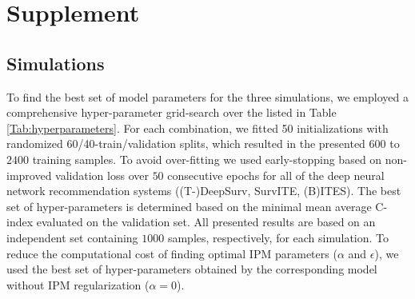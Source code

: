 \documentclass{article}
\newcommand{\beginsupplement}{%
	\setcounter{subsection}{0}
	\renewcommand{\thesubsection}{S\arabic{subsection}}
	\setcounter{table}{0}
	\renewcommand{\thetable}{S\arabic{table}}%
	\setcounter{figure}{0}
	\renewcommand{\thefigure}{S\arabic{figure}}%
	\newcounter{SIfig}
	\renewcommand{\theSIfig}{S\arabic{SIfig}}
}
\begin{document}
	
	
	
	\small
	
	

	\clearpage
	\onecolumn
	\beginsupplement
	\section*{Supplement}
	\subsection{Simulations}
	To find the best set of model parameters for the three simulations, we employed a comprehensive hyper-parameter grid-search over the listed in Table \ref{Tab:hyperparameters}. For each combination, we fitted 50 initializations with randomized 60/40-train/validation splits, which resulted in the presented $600$ to $2400$ training samples. To avoid over-fitting we used early-stopping based on non-improved validation loss over $50$ consecutive epochs for all of the deep neural network recommendation systems ((T-)DeepSurv, SurvITE, (B)ITES). The best set of hyper-parameters is determined based on the minimal mean average C-index evaluated on the validation set. All presented results are based on an independent set containing $1000$ samples, respectively, for each simulation.
	To reduce the computational cost of finding optimal IPM parameters ($\alpha$ and $\epsilon$), we used the best set of hyper-parameters obtained by the corresponding model without IPM regularization ($\alpha=0$).
		
\end{document}
